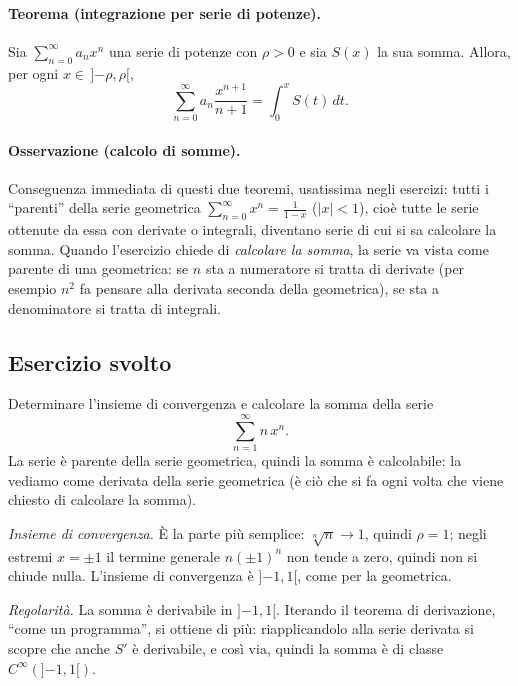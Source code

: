 \paragraph{Teorema (integrazione per serie di potenze).}
Sia $\sum_{n=0}^{\infty} a_n x^n$ una serie di potenze con $\rho>0$ e sia $S(x)$ la sua somma. Allora, per ogni
$x\in\,]{-\rho},\rho[$,
\[
  \sum_{n=0}^{\infty} a_n \frac{x^{n+1}}{n+1} = \int_0^x S(t)\,dt .
\]

\paragraph{Osservazione (calcolo di somme).}
Conseguenza immediata di questi due teoremi, usatissima negli esercizi: tutti i ``parenti'' della serie
geometrica $\sum_{n=0}^{\infty} x^n = \frac{1}{1-x}$ ($|x|<1$), cioè tutte le serie ottenute da essa con
derivate o integrali, diventano serie di cui si sa calcolare la somma. Quando l'esercizio chiede di
\emph{calcolare la somma}, la serie va vista come parente di una geometrica: se $n$ sta a numeratore si tratta di
derivate (per esempio $n^2$ fa pensare alla derivata seconda della geometrica), se sta a denominatore si tratta
di integrali.

\subsection{Esercizio svolto}

Determinare l'insieme di convergenza e calcolare la somma della serie
\[
  \sum_{n=1}^{\infty} n\, x^n .
\]
La serie è parente della serie geometrica, quindi la somma è calcolabile: la vediamo come derivata della serie
geometrica (è ciò che si fa ogni volta che viene chiesto di calcolare la somma).

\emph{Insieme di convergenza.} È la parte più semplice: $\sqrt[n]{n}\to 1$, quindi $\rho=1$; negli estremi
$x=\pm1$ il termine generale $n(\pm1)^n$ non tende a zero, quindi non si chiude nulla. L'insieme di convergenza
è $]{-1},1[$, come per la geometrica.

\emph{Regolarità.} La somma è derivabile in $]{-1},1[$.
Iterando il teorema di derivazione, ``come un programma'', si ottiene di più: riapplicandolo alla serie derivata
si scopre che anche $S'$ è derivabile, e così via, quindi la somma è di classe $C^\infty(]{-1},1[)$.


